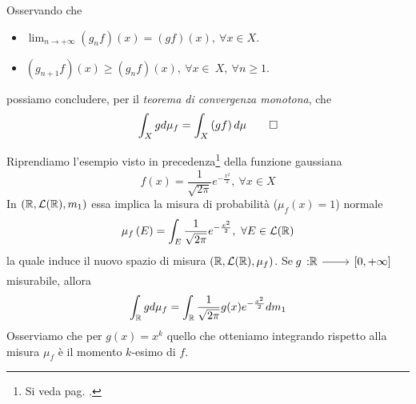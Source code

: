 \begin{demonstration}
\begin{enumerate}[label=\Roman*]
\begin{equation*}
	\end{equation*}
Osservando che
\begin{itemize}
	\item $\displaystyle\lim_{n\to+\infty}\left(g_nf\right)(x)=\left(gf\right)(x),\ \forall x\in X$.
	\item $\left(g_{n+1}f\right)(x)\geq \left(g_nf\right)(x),\ \forall x\in\ X,\ \forall n\geq 1$.
\end{itemize}
possiamo concludere, per il \textit{teorema di convergenza monotona}, che
\begin{equation*}
	\int_Xgd\mu_f=\int_X\left(gf\right)d\mu\qedhere
\end{equation*}
	\end{enumerate}
\end{demonstration}
\begin{example}
	Riprendiamo l'esempio visto in precedenza\footnote{Si veda pag. \pageref{gaussiana}.} della funzione gaussiana
	\begin{equation*}
		f(x)=\frac{1}{\sqrt{2\pi}}e^{-\frac{x^2}{2}},\ \forall x\in X
	\end{equation*}
	In $\left(\mathbb{R},\mathcal{L}(\mathbb{R}),m_1\right)$ essa implica la misura di probabilità ($\mu_f(x)=1$) normale
	\begin{equation*}
		\mu_f\left(E\right)=\int_E\frac{1}{\sqrt{2\pi}}e^{-\frac{x^2}{2}},\ \forall E\in \mathcal{L}(\realset)
	\end{equation*}
la quale induce il nuovo spazio di misura $\left(\mathbb{R},\mathcal{L}(\mathbb{R}),\mu_f\right)$. Se $\funz{g}{\realset}{\left[0,+\infty\right]}$ misurabile, allora
\begin{equation*}
	\int_{\mathbb{R}} gd\mu_f=\int_{\mathbb{R}}\frac{1}{\sqrt{2\pi}}g(x)e^{-\frac{x^2}{2}}dm_1
\end{equation*}
Osserviamo che per $g(x)=x^k$ quello che otteniamo integrando rispetto alla misura $\mu_f$ è il momento $k$-esimo di $f$.
\end{example}
